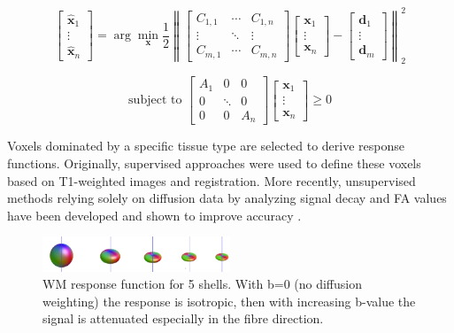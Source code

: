 \begin{equation}
\begin{bmatrix}
\hat{\boldsymbol{x}}_1 \\
\vdots \\
\hat{\boldsymbol{x}}_n
\end{bmatrix}
=
\arg\min_{\boldsymbol{x}}
\frac{1}{2}
\left\lVert
\begin{bmatrix}
{C}_{1,1} & \cdots & {C}_{1,n} \\
\vdots & \ddots & \vdots \\
{C}_{m,1} & \cdots & {C}_{m,n}
\end{bmatrix}
\begin{bmatrix}
\boldsymbol{x}_1 \\
\vdots \\
\boldsymbol{x}_n
\end{bmatrix}
-
\begin{bmatrix}
\boldsymbol{d}_1 \\
\vdots \\
\boldsymbol{d}_m
\end{bmatrix}
\right\rVert_2^2
\end{equation}

\[
\text{subject to } 
\begin{bmatrix}
{A}_1 & 0 & 0 \\
0 & \ddots & 0 \\
0 & 0 & {A}_n
\end{bmatrix}
\begin{bmatrix}
\mathbf{x}_1 \\
\vdots \\
\boldsymbol{x}_n
\end{bmatrix}
\geq 0
\]


Voxels dominated by a specific tissue type are selected to derive response functions. Originally, supervised approaches were used to define these voxels based on T1-weighted images and registration. More recently, unsupervised methods relying solely on diffusion data by analyzing signal decay and FA values have been developed and shown to improve accuracy \cite{Raffelt2016}.
\begin{figure}[h]
  \centering
  \includegraphics[width=0.5\textwidth]{Images/response.png} %
  \caption{WM response function for 5 shells. With b=0 (no diffusion weighting) the response is isotropic, then with increasing b-value the signal is attenuated especially in the fibre direction.}
  \label{fig:response}
\end{figure}

